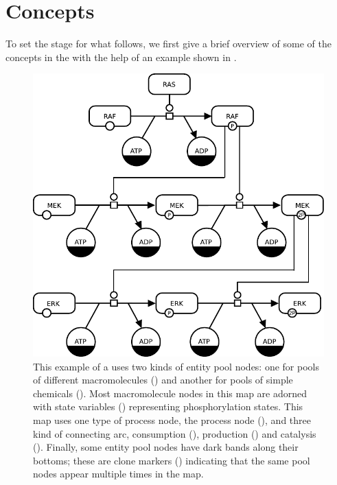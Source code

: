 \chapter{Concepts}
\label{chp:concepts}

To set the stage for what follows, we first give a brief overview of some of the concepts in the \PDl with the help of an example shown in .

\begin{figure}[H]
  \centering
  \vspace*{-0.75em}
  \includegraphics[scale=0.8]{examples/MAPK-only}
  \caption{This example of a \PD uses two kinds of entity pool nodes: one
    for pools of different macromolecules () and
    another for pools of simple chemicals ().  Most
    macromolecule nodes in this map are adorned with state
    variables () representing phosphorylation states.
    This map uses one type of process node, the process node
    (), and three kind of connecting arc, consumption (), production () and catalysis
    ().  Finally, some entity pool nodes have dark bands
    along their bottoms; these are clone markers () indicating that the same
    pool nodes appear multiple times in the map.}
  \label{fig:eg1}
\end{figure}

